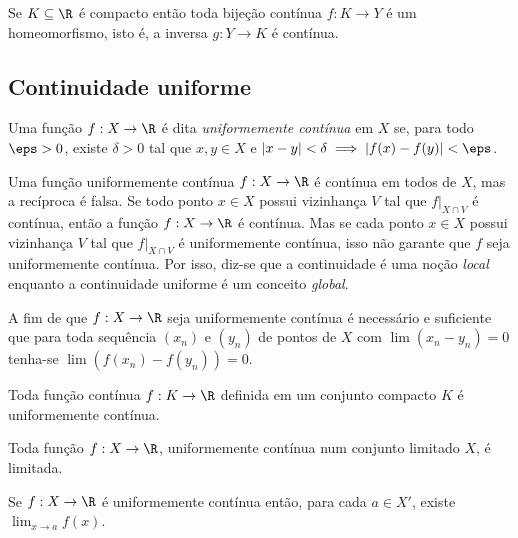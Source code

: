 \documentclass{article}
\begin{document}
\begin{prop}
    Se \(K \subseteq \R\) é compacto então toda bijeção contínua \(f: K \to Y\) é um homeomorfismo, isto é, a inversa \(g: Y \to K\) é contínua.
\end{prop}

\subsection{Continuidade uniforme}

\begin{defn}
    Uma função \(f: X \to \R\) é dita \emph{uniformemente contínua} em \(X\) se, para todo \(\eps > 0\), existe \(\delta > 0\) tal que \(x, y \in X\) e \(|x - y| < \delta \implies |f(x) - f(y)| < \eps\).
\end{defn}

\begin{rem}
    Uma função uniformemente contínua \(f: X \to \R\) é contínua em todos de \(X\), mas a recíproca é falsa.
    Se todo ponto \(x \in X\) possui vizinhança \(V\) tal que \(f|_{X \cap V}\) é contínua, então a função \(f: X \to \R\) é contínua. Mas se cada ponto \(x \in X\) possui vizinhança \(V\) tal que \(f|_{X \cap V}\) é uniformemente contínua, isso não garante que \(f\) seja uniformemente contínua.
    Por isso, diz-se que a continuidade é uma noção \emph{local} enquanto a continuidade uniforme é um conceito \emph{global}.
\end{rem}

\begin{prop}
    A fim de que \(f: X \to \R\) seja uniformemente contínua é necessário e suficiente que para toda sequência \((x_n)\) e \((y_n)\) de pontos de \(X\) com \(\lim (x_n - y_n) = 0\) tenha-se \(\lim (f(x_n) - f(y_n)) = 0\).
\end{prop}

\begin{prop}
    Toda função contínua \(f: K \to \R\) definida em um conjunto compacto \(K\) é uniformemente contínua.
\end{prop}

\begin{prop}
    Toda função \(f: X \to \R\), uniformemente contínua num conjunto limitado \(X\), é limitada.
\end{prop}

\begin{prop}
    Se \(f: X \to \R\) é uniformemente contínua então, para cada \(a \in X'\), existe \(\lim_{x \to a} f(x)\).
\end{prop}
\end{document}

